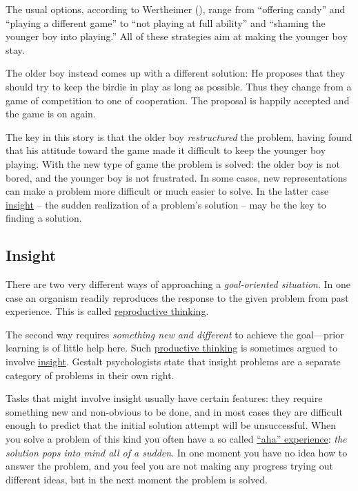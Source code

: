 \documentclass[
]{krantz}
\begin{document}
The usual options, according to Wertheimer (), range from ``offering candy'' and ``playing a different game'' to ``not playing at full ability'' and ``shaming the younger boy into playing.'' All of these strategies aim at making the younger boy stay.

The older boy instead comes up with a different solution: He proposes that they should try to keep the birdie in play as long as possible. Thus they change from a game of competition to one of cooperation. The proposal is happily accepted and the game is on again.

The key in this story is that the older boy \emph{restructured} the problem, having found that his attitude toward the game made it difficult to keep the younger boy playing. With the new type of game the problem is solved: the older boy is not bored, and the younger boy is not frustrated. In some cases, new representations can make a problem more difficult or much easier to solve. In the latter case \hyperref[insight]{insight} -- the sudden realization of a problem's solution -- may be the key to finding a solution.

\subsection*{Insight}\label{insight}


There are two very different ways of approaching a \emph{goal-oriented situation}. In one case an organism readily reproduces the response to the given problem from past experience. This is called \hyperref[reproductive-thinking]{reproductive thinking}.

The second way requires \emph{something new and different} to achieve the goal---prior learning is of little help here. Such \hyperref[productive-thinking]{productive thinking} is sometimes argued to involve \hyperref[insight]{insight}. Gestalt psychologists state that insight problems are a separate category of problems in their own right.

Tasks that might involve insight usually have certain features: they require something new and non-obvious to be done, and in most cases they are difficult enough to predict that the initial solution attempt will be unsuccessful. When you solve a problem of this kind you often have a so called \hyperref[aha-experience]{``aha'' experience}: \emph{the solution pops into mind all of a sudden}. In one moment you have no idea how to answer the problem, and you feel you are not making any progress trying out different ideas, but in the next moment the problem is solved.
\end{document}
